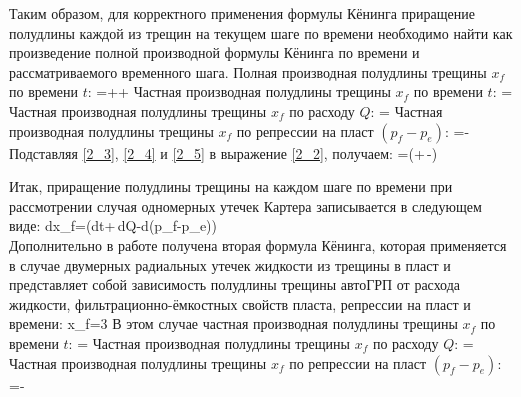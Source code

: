Таким образом, для корректного применения формулы Кёнинга приращение полудлины каждой из трещин на текущем шаге по времени необходимо найти как произведение полной производной формулы Кёнинга по времени и рассматриваемого временного шага.\newline
Полная производная полудлины трещины $x_{\!f}$ по времени $t$:
\beq\label{2_2}
=++
\eeq
Частная производная полудлины трещины $x_{\!f}$ по времени $t$:
\beq\label{2_3}
=
\eeq
Частная производная полудлины трещины $x_{\!f}$ по расходу $Q$:
\beq\label{2_4}
=
\eeq
Частная производная полудлины трещины $x_{\!f}$ по репрессии на пласт $\left(p_{\!f}-p_e\right)$:
\beq\label{2_5}
=-
\eeq
Подставляя \eqref{2_3}, \eqref{2_4} и \eqref{2_5} в выражение \eqref{2_2}, получаем:
\beq\label{2_6}
=\left(+\,-\right)
\eeq
             
Итак, приращение полудлины трещины на каждом шаге по времени при рассмотрении случая одномерных утечек Картера записывается в следующем виде:
\beq\label{2_7}
dx_{\!f}=\left(dt+\,dQ-d(p_{\!f}-p_e)\right)
\eeq\\

Дополнительно в работе \cite{koning} получена вторая формула Кёнинга, которая применяется в случае двумерных радиальных утечек жидкости из трещины в пласт и представляет собой зависимость полудлины трещины автоГРП от расхода жидкости, фильтрационно-ёмкостных свойств пласта, репрессии на пласт и времени:
\beq\label{Koning_second}
x_{\!f}=3
\eeq
В этом случае частная производная полудлины трещины $x_f$ по времени $t$:
\beq
{}=
\eeq
Частная производная полудлины трещины $x_f$ по расходу $Q$:
\beq
{}=
\eeq
Частная производная полудлины трещины $x_f$ по репрессии на пласт $\left(p_f-p_e\right)$:
\beq
{}=-
\eeq

